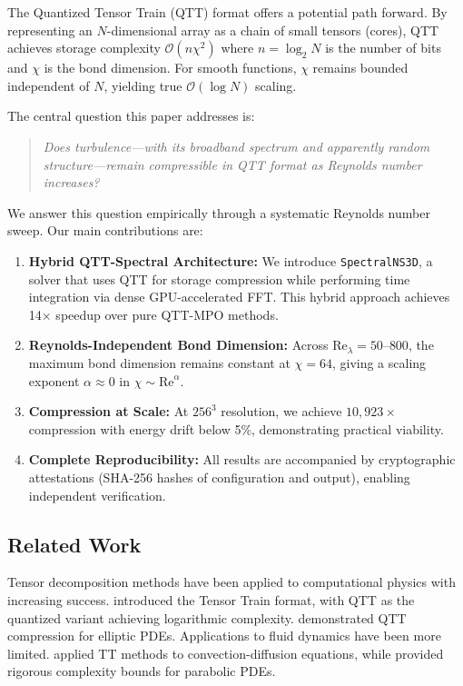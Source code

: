 \documentclass[11pt,a4paper]{article}
\newcommand{\bigO}{\mathcal{O}}
\theoremstyle{definition}
\begin{document}
The Quantized Tensor Train (QTT) format offers a potential path forward.
By representing an $N$-dimensional array as a chain of small tensors (cores), QTT achieves storage complexity $\bigO(n \chi^2)$ where $n = \log_2 N$ is the number of bits and $\chi$ is the bond dimension.
For smooth functions, $\chi$ remains bounded independent of $N$, yielding true $\bigO(\log N)$ scaling.

The central question this paper addresses is:
\begin{quote}
\emph{Does turbulence—with its broadband spectrum and apparently random structure—remain compressible in QTT format as Reynolds number increases?}
\end{quote}

We answer this question empirically through a systematic Reynolds number sweep.
Our main contributions are:

\begin{enumerate}
    \item \textbf{Hybrid QTT-Spectral Architecture:} We introduce \texttt{SpectralNS3D}, a solver that uses QTT for storage compression while performing time integration via dense GPU-accelerated FFT. This hybrid approach achieves 14$\times$ speedup over pure QTT-MPO methods.
    
    \item \textbf{Reynolds-Independent Bond Dimension:} Across $\text{Re}_\lambda = 50$--$800$, the maximum bond dimension remains constant at $\chi = 64$, giving a scaling exponent $\alpha \approx 0$ in $\chi \sim \text{Re}^\alpha$.
    
    \item \textbf{Compression at Scale:} At $256^3$ resolution, we achieve $10{,}923\times$ compression with energy drift below 5\%, demonstrating practical viability.
    
    \item \textbf{Complete Reproducibility:} All results are accompanied by cryptographic attestations (SHA-256 hashes of configuration and output), enabling independent verification.
\end{enumerate}

\subsection{Related Work}

Tensor decomposition methods have been applied to computational physics with increasing success.
\citet{oseledets2011tensor} introduced the Tensor Train format, with QTT as the quantized variant achieving logarithmic complexity.
\citet{khoromskij2011quantics} demonstrated QTT compression for elliptic PDEs.
Applications to fluid dynamics have been more limited.
\citet{dolgov2012fast} applied TT methods to convection-diffusion equations, while \citet{bachmayr2016tensor} provided rigorous complexity bounds for parabolic PDEs.
\end{document}

